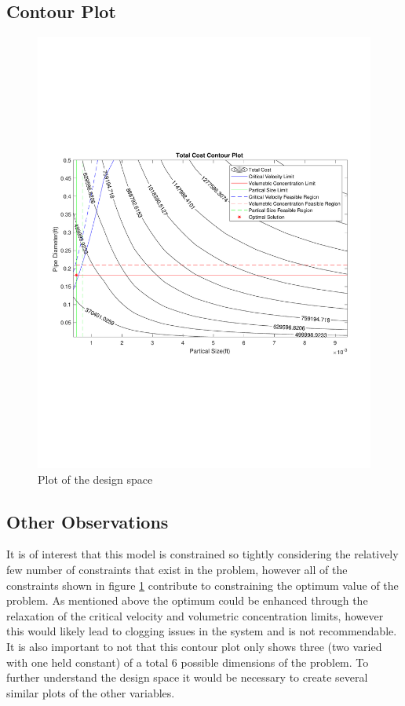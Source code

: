 \documentclass{article}
\begin{document}
\subsection{Contour Plot}
\begin{figure}[H]
	\centering
	\includegraphics[width=0.9\linewidth]{PlotBig}
	\caption{Plot of the design space}
	\label{fig:plotzoomed}
\end{figure}

\subsection{Other Observations}
It is of interest that this model is constrained so tightly considering the relatively few number of constraints that exist in the problem, however all of the constraints shown in figure \ref{fig:plotzoomed} contribute to constraining the optimum value of the problem.  As mentioned above the optimum could be enhanced through the relaxation of the critical velocity and volumetric concentration limits, however this would likely lead to clogging issues in the system and is not recommendable.  It is also important to not that this contour plot only shows three (two varied with one held constant) of a total 6 possible dimensions of the problem.  To further understand the design space it would be necessary to create several similar plots of the other variables.
\end{document}

